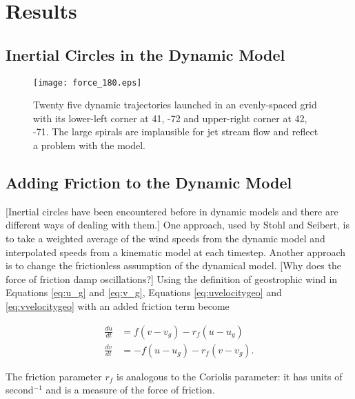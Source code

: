 \chapter{Results}

\section{Inertial Circles in the Dynamic Model}

\begin{figure}
    \texttt{[image: force\_180.eps]}
    \caption{Twenty five dynamic trajectories launched in an evenly-spaced grid with its lower-left corner at 41, -72 and upper-right corner at 42, -71. 
    The large spirals are implausible for jet stream flow and reflect a problem with the model.}
    \label{fig:force_180}
\end{figure}

\section{Adding Friction to the Dynamic Model}

[Inertial circles have been encountered before in dynamic models and there are different ways of dealing with them.] \cite{stohl_accuracy_1998}
One approach, used by Stohl and Seibert, is to take a weighted average of the wind speeds from the dynamic model and interpolated speeds from a kinematic model at each timestep.
Another approach is to change the frictionless assumption of the dynamical model.
[Why does the force of friction damp oscillations?]
Using the definition of geostrophic wind in Equations \ref{eq:u_g} and \ref{eq:v_g}, Equations \ref{eq:uvelocitygeo} and \ref{eq:vvelocitygeo} with an added friction term become

\begin{align}
    \frac{du}{dt} &= f (v - v_g) - r_f (u - u_g) \\
    \frac{dv}{dt} &= -f (u - u_g) - r_f (v - v_g).   
\end{align}

The friction parameter $r_f$ is analogous to the Coriolis parameter: it has units of second$^{-1}$ and is a measure of the force of friction.
